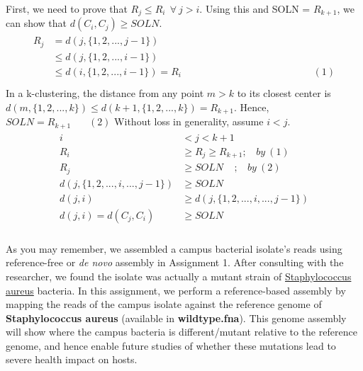 \documentclass[solution,addpoints,12pt]{exam}
\begin{document}
\begin{questions}
\begin{parts}
\begin{solution}
    First, we need to prove that $R_j \leq  R_i ~~\forall~ j > i$. Using this and SOLN = $R_{k+1}$, we can show that $d(C_i, C_j) \geq SOLN$.
    \begin{eqnarray*}
        \begin{aligned}
            R_j &= d(j, \{ 1, 2, ..., j-1\})\\
                &\leq d(j, \{ 1, 2, ..., i-1\})\\
            &\leq d(i, \{ 1, 2, ..., i-1\}) = R_i~~~~~~~~~~~~~~~~~~~~~~~~~~~~~~~~~~~~~~~~~~~~~~~~~~~~~~~~~~~~(1)\\
        \end{aligned}
    \end{eqnarray*}
    In a k-clustering, the distance from any point $m > k$ to its closest center is $d(m, \{ 1, 2, ..., k\}) \leq d(k+1, \{ 1, 2, ..., k\}) = R_{k+1}$. Hence, $SOLN = R_{k+1}~~~~~~~~(2)
    $
    Without loss in generality, assume $i<j$.
    \begin{eqnarray*}
        \begin{aligned}
            i&<j<k+1\\
           R_i &\geq R_j \geq R_{k+1};~~~~ by~(1)\\
           R_j &\geq SOLN~~~~~; ~~~~by~(2)\\
           d(j, \{ 1, 2, ..., i,..., j-1\}) &\geq SOLN\\
           d(j, i) &\geq d(j, \{ 1, 2, ..., i,..., j-1\})\\
           d(j, i) = d(C_j, C_i) &\geq SOLN\\
        \end{aligned}
    \end{eqnarray*}
\end{solution}
\end{parts}


 As you may remember, we assembled a campus bacterial isolate's reads using reference-free or {\em de novo} assembly in Assignment 1. After consulting with the researcher, we found the isolate was actually a mutant strain of \href{https://en.wikipedia.org/wiki/Staphylococcus_aureus}{Staphylococcus aureus} bacteria. In this assignment, we perform a reference-based assembly by mapping the reads of the campus isolate against the reference genome of \textbf{Staphylococcus aureus} (available in \textbf{wildtype.fna}). This genome assembly will show where the campus bacteria is different/mutant relative to the reference genome, and hence enable future studies of whether these mutations lead to severe health impact on hosts.  


\end{questions}
\end{document}
